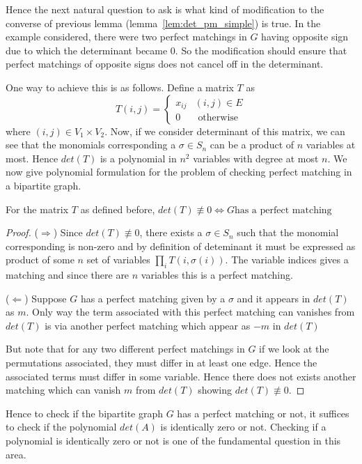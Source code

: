 Hence the next natural question to ask is what kind of modification to the
converse of previous lemma (lemma~\ref{lem:det_pm_simple}) is true. In the
example considered, there were two perfect matchings in $G$ having opposite 
sign due to which the determinant became $0$. So the modification should
ensure that perfect matchings of opposite signs does not cancel off in the
determinant.

One way to achieve this is as follows.  Define a matrix $T$ as
\[ T(i,j) = \begin{cases}
		x_{ij} & (i, j) \in E \\
		      0 & \text{ otherwise}
	\end{cases}
\]
where $(i,j) \in V_1 \times V_2$.
Now, if we consider determinant of this matrix, we can see that the monomials
corresponding a $\sigma \in S_n$ can be a product of $n$ variables at most.
Hence $det(T)$ is a polynomial in $n^2$ variables with degree at most $n$.
We now give polynomial formulation for the problem of checking perfect
matching in a bipartite graph.
\begin{claim}
For the matrix $T$ as defined before, $det(T) \not \equiv 0 \iff \text{$G$
has a perfect matching}$
\end{claim}
\begin{proof}
($\Rightarrow$) Since $det(T) \not \equiv 0$, there exists a $\sigma \in S_n$
such that the monomial corresponding is non-zero and by definition of
deteminant it must be expressed as product of some $n$ set of variables
$\prod_i T(i,\sigma(i))$. The variable indices gives a matching and since
there are $n$ variables this is a perfect matching.

($\Leftarrow$) Suppose $G$ has a perfect matching given by a $\sigma$ and it
appears in $det(T)$ as $m$. Only way the term associated with this perfect
matching can vanishes from $det(T)$ is via another perfect matching which
appear as $-m$ in $det(T)$

But note that for any two different perfect matchings in $G$ if we look at the
permutations associated, they must differ in at least one edge. Hence the
associated terms must differ in some variable. Hence there does not exists
another matching which can vanish $m$ from $det(T)$ showing $det(T) \not \equiv
0$.
\end{proof}

Hence to check if the bipartite graph $G$ has a perfect matching or not, it
suffices to check if the polynomial $det(A)$ is identically zero or not.
Checking if a polynomial is identically zero or not is one of the fundamental
question in this area.

